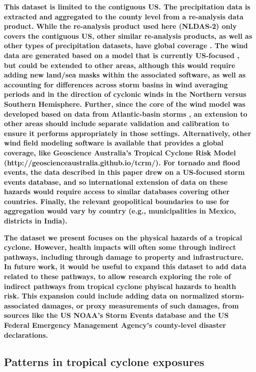 \textbf{This dataset is limited to the contiguous US. The precipitation data is
extracted and aggregated to the county level from a re-analysis data product.
While the re-analysis product used here (NLDAS-2) only covers the contiguous
US, other similar re-analysis products, as well as other types of precipitation
datasets, have global coverage \parencite{sun2018review}. The wind data are
generated based on a model that is currently US-focused
\parencite{stormwindmodel}, but could be extended to other areas, although this
would require adding new land/sea masks within the associated software, as well
as accounting for differences across storm basins in wind averaging periods
\parencite{harper2010guidelines} and in the direction of cyclonic winds in the
Northern versus Southern Hemisphere. Further, since the core of the wind model
was developed based on data from Atlantic-basin storms
\parencite{willoughby2006parametric}, an extension to other areas should
include separate validation and calibration to ensure it performs appropriately
in those settings. Alternatively, other wind field modeling software is
available that provides a global coverage, like Geoscience Australia's Tropical
Cyclone Risk Model (http://geoscienceaustralia.github.io/tcrm/). For tornado
and flood events, the data described in this paper drew on a US-focused storm
events database, and so international extension of data on these hazards would
require access to similar databases covering other countries. Finally, the
relevant geopolitical boundaries to use for aggregation would vary by country
(e.g., municipalities in Mexico, districts in India).}

\textbf{The dataset we present focuses on the physical hazards of a tropical
cyclone.  However, health impacts will often some through indirect pathways,
including through damage to property and infrastructure. In future work, it
would be useful to expand this dataset to add data related to these pathways,
to allow research exploring the role of indirect pathways from tropical cyclone
phyiscal hazards to health risk. This expansion could include adding data on
normalized storm-associated damages, or proxy measurements of such damages,
from sources like the US NOAA's Storm Events database and the US Federal
Emergency Management Agency's county-level disaster declarations.}

\subsection*{Patterns in tropical cyclone exposures}

